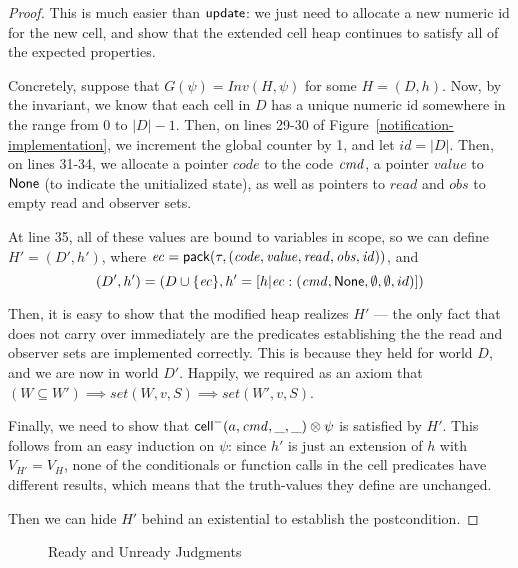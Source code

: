 \begin{proof}
This is much easier than $\mathsf{update}$: we just need to allocate a new
numeric id for the new cell, and show that the extended cell heap
continues to satisfy all of the expected properties.

Concretely, suppose that $G(\psi) = \mathit{Inv}{(H, \psi)}$ for some
$H = (D,h)$. Now, by the invariant, we know that each cell in $D$ has
a unique numeric id somewhere in the range from $0$ to $|D|-1$. Then,
on lines 29-30 of Figure~\ref{notification-implementation}, we
increment the global counter by 1, and let $id = |D|$.  Then, on lines
31-34, we allocate a pointer $\mathit{code}$ to the code $\mathit{cmd}$, a
pointer $\mathit{value}$ to $\mathsf{None}$ (to indicate the unitialized
state), as well as pointers to $\mathit{read}$ and $\mathit{obs}$ to
empty read and observer sets.

At line 35, all of these values are bound to variables in scope, so we
can define $H' = (D',h')$, where $\mathit{ec} = \mathsf{pack}({\tau}, {\mathit{(code, value, read, obs, id)}})$, 
and 
\begin{displaymath}
(D',h') = (D \cup \{{\mathit{ec}}\}, h' = [h|\mathit{ec}: (\mathit{cmd}, \mathsf{None}, \emptyset, \emptyset, id)])
\end{displaymath}

Then, it is easy to show that the modified heap realizes $H'$ --- the
only fact that does not carry over immediately are the predicates
establishing the the read and observer sets are implemented
correctly. This is because they held for world $D$, and we are now in
world $D'$. Happily, we required as an axiom that $(W \subseteq W')
\implies \mathit{set}(W, v, S) \implies \mathit{set}(W', v, S)$.

Finally, we need to show that $\mathsf{cell}^{-}({a}, {\mathit{cmd}}, {\_}, {\_}) \otimes \psi$ is
satisfied by $H'$. This follows from an easy induction on $\psi$:
since $h'$ is just an extension of $h$ with $V_{H'} = V_H$, none
of the conditionals or function calls in the cell predicates have
different results, which means that the truth-values they define
are unchanged. 

Then we can hide $H'$ behind an existential to establish the postcondition. 
\end{proof}

\begin{figure}
\mbox{}
\caption{Ready and Unready Judgments}
\label{readiness}
\end{figure}

